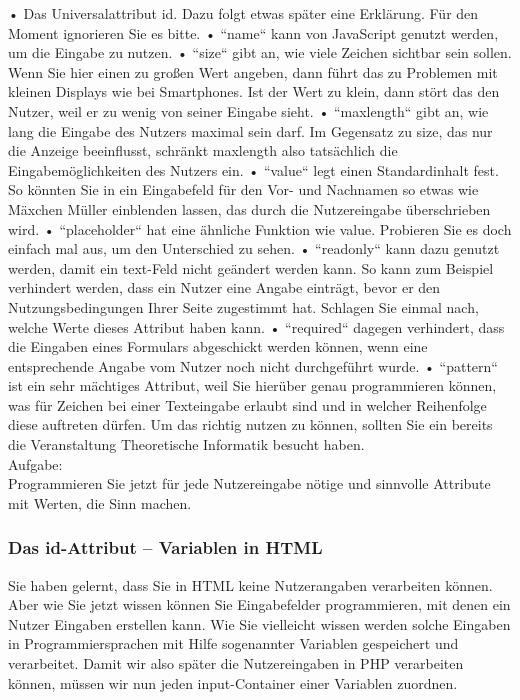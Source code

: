 •	Das Universalattribut id. Dazu folgt etwas später eine Erklärung. Für den Moment ignorieren Sie es bitte.
•	``name`` kann von JavaScript genutzt werden, um die Eingabe zu nutzen.
•	``size`` gibt an, wie viele Zeichen sichtbar sein sollen. Wenn Sie hier einen zu großen Wert angeben, dann führt das zu Problemen mit kleinen Displays wie bei Smartphones. Ist der Wert zu klein, dann stört das den Nutzer, weil er zu wenig von seiner Eingabe sieht.
•	``maxlength`` gibt an, wie lang die Eingabe des Nutzers maximal sein darf. Im Gegensatz zu size, das nur die Anzeige beeinflusst, schränkt maxlength also tatsächlich die Eingabemöglichkeiten des Nutzers ein.
•	``value`` legt einen Standardinhalt fest. So könnten Sie in ein Eingabefeld für den Vor- und Nachnamen so etwas wie Mäxchen Müller einblenden lassen, das durch die Nutzereingabe überschrieben wird.
•	``placeholder`` hat eine ähnliche Funktion wie value. Probieren Sie es doch einfach mal aus, um den Unterschied zu sehen.
•	``readonly`` kann dazu genutzt werden, damit ein text-Feld nicht geändert werden kann. So kann zum Beispiel verhindert werden, dass ein Nutzer eine Angabe einträgt, bevor er den Nutzungsbedingungen Ihrer Seite zugestimmt hat. Schlagen Sie einmal nach, welche Werte dieses Attribut haben kann.
•	``required`` dagegen verhindert, dass die Eingaben eines Formulars abgeschickt werden können, wenn eine entsprechende Angabe vom Nutzer noch nicht durchgeführt wurde.
•	``pattern`` ist ein sehr mächtiges Attribut, weil Sie hierüber genau programmieren können, was für Zeichen bei einer Texteingabe erlaubt sind und in welcher Reihenfolge diese auftreten dürfen. Um das richtig nutzen zu können, sollten Sie ein bereits die Veranstaltung Theoretische Informatik besucht haben.\\

Aufgabe: \\

Programmieren Sie jetzt für jede Nutzereingabe nötige und sinnvolle Attribute mit Werten, die Sinn machen.

\subsubsection{Das id-Attribut – Variablen in HTML}

Sie haben gelernt, dass Sie in HTML keine Nutzerangaben verarbeiten können. Aber wie Sie jetzt wissen können Sie Eingabefelder programmieren, mit denen ein Nutzer Eingaben erstellen kann. Wie Sie vielleicht wissen werden solche Eingaben in Programmiersprachen mit Hilfe sogenannter Variablen gespeichert und verarbeitet. Damit wir also später die Nutzereingaben in PHP verarbeiten können, müssen wir nun jeden input-Container einer Variablen zuordnen.\\

